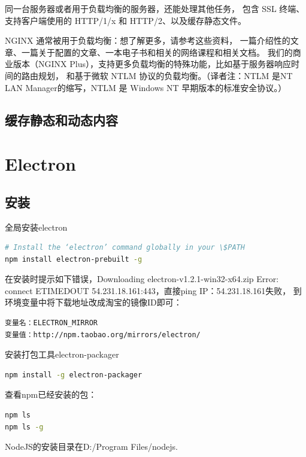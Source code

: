 \documentclass{book}
\begin{document}
同一台服务器或者用于负载均衡的服务器，还能处理其他任务，
包含 SSL 终端、支持客户端使用的 HTTP/1/x 和 HTTP/2、以及缓存静态文件。

NGINX 通常被用于负载均衡：想了解更多，请参考这些资料，
一篇介绍性的文章、一篇关于配置的文章、一本电子书和相关的网络课程和相关文档。
我们的商业版本（NGINX Plus），支持更多负载均衡的特殊功能，比如基于服务器响应时间的路由规划，
和基于微软 NTLM 协议的负载均衡。（译者注：NTLM 是NT LAN Manager的缩写，NTLM 是 Windows NT 早期版本的标准安全协议。）

\subsection{缓存静态和动态内容}

\section{Electron}

\subsection{安装}

全局安装electron

\begin{lstlisting}[language=Bash]
# Install the ‘electron’ command globally in your \$PATH
npm install electron-prebuilt -g
\end{lstlisting}

在安装时提示如下错误，Downloading electron-v1.2.1-win32-x64.zip
Error: connect ETIMEDOUT 54.231.18.161:443，直接ping IP：54.231.18.161失败，
到环境变量中将下载地址改成淘宝的镜像ID即可：

\begin{lstlisting}
变量名：ELECTRON_MIRROR
变量值：http://npm.taobao.org/mirrors/electron/
\end{lstlisting}

安装打包工具electron-packager

\begin{lstlisting}[language=Bash]
npm install -g electron-packager
\end{lstlisting}

查看npm已经安装的包：

\begin{lstlisting}[language=Bash]
npm ls
npm ls -g
\end{lstlisting}


NodeJS的安装目录在D:/Program Files/nodejs.
\end{document}
